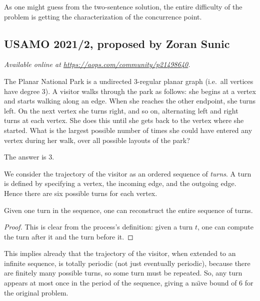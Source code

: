 \documentclass[11pt]{scrartcl}
\begin{document}
\begin{remark*}
  As one might guess from the two-sentence solution,
  the entire difficulty of the problem
  is getting the characterization of the concurrence point.
\end{remark*}
\pagebreak

\subsection{USAMO 2021/2, proposed by Zoran Sunic}
\textsl{Available online at \url{https://aops.com/community/p21498640}.}
\begin{mdframed}[style=mdpurplebox,frametitle={Problem statement}]
The Planar National Park is a undirected 3-regular planar graph
(i.e.\ all vertices have degree $3$).
A visitor walks through the park as follows:
she begins at a vertex and starts walking along an edge.
When she reaches the other endpoint, she turns left.
On the next vertex she turns right, and so on,
alternating left and right turns at each vertex.
She does this until she gets back to the vertex where she started.
What is the largest possible number of times she could have entered
any vertex during her walk, over all possible layouts of the park?
\end{mdframed}
The answer is $3$.

We consider the trajectory of the visitor
as an ordered sequence of \emph{turns}.
A turn is defined by specifying a vertex,
the incoming edge, and the outgoing edge.
Hence there are six possible turns for each vertex.

\begin{claim*}
  Given one turn in the sequence,
  one can reconstruct the entire sequence of turns.
\end{claim*}
\begin{proof}
  This is clear from the process's definition:
  given a turn $t$, one can compute the turn after it
  and the turn before it.
\end{proof}

This implies already that the trajectory of the visitor,
when extended to an infinite sequence,
is totally periodic (not just eventually periodic),
because there are finitely many possible turns,
so some turn must be repeated.
So, any turn appears at most once in the period of the sequence,
giving a na\"{\i}ve bound of $6$ for the original problem.
\end{document}
